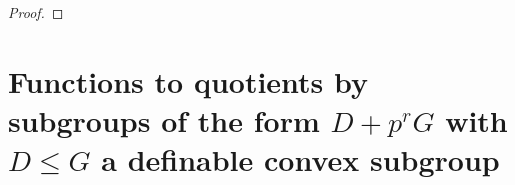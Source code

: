 \documentclass[a4paper,11pt]{article}
\renewcommand{\iff}{\Longleftrightarrow}
\begin{document}
\begin{proof}
\end{proof}


\section{Functions to quotients by subgroups of the form $D+p^rG$ with $D\leq G$ a definable convex subgroup}\label{D+p^rG section}
\end{document}
